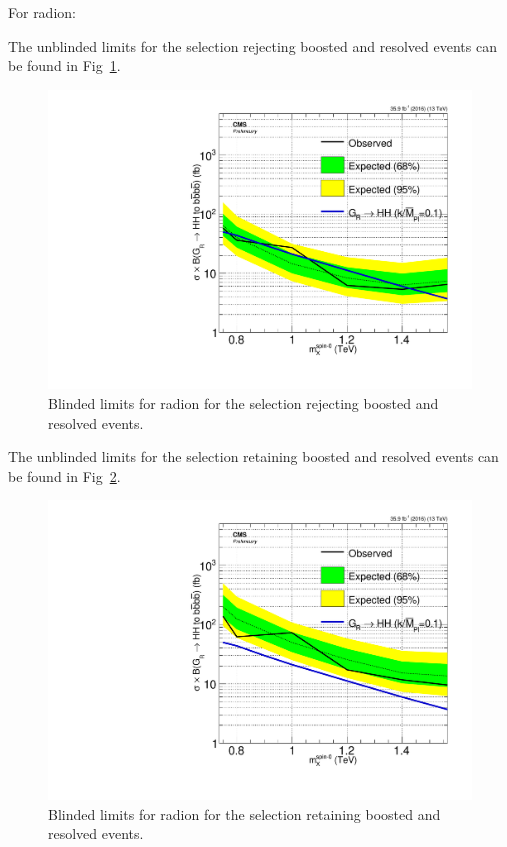 For radion:

The unblinded limits for the selection rejecting boosted and resolved events can be found in Fig~\ref{fig:radblindboth}.

\begin{figure}[thb!]
\begin{center}
\includegraphics[scale=0.5]{F5/brazilianFlag_Rad_2p1retain_HH4b2p1_HH4b2p1_13TeV.pdf}
\end{center}
\caption{Blinded limits for radion for the selection rejecting boosted and resolved events.}
\label{fig:radblindboth}
\end{figure} 

The unblinded limits for the selection retaining boosted and resolved events can be found in Fig~\ref{fig:radblindnone}.

\begin{figure}[thb!]
\begin{center}
\includegraphics[scale=0.5]{F5/brazilianFlag_Rad_2p1boostres_HH4b2p1_HH4b2p1_13TeV.pdf}
\end{center}
\caption{Blinded limits for radion for the selection retaining boosted and resolved events.}
\label{fig:radblindnone}
\end{figure} 


